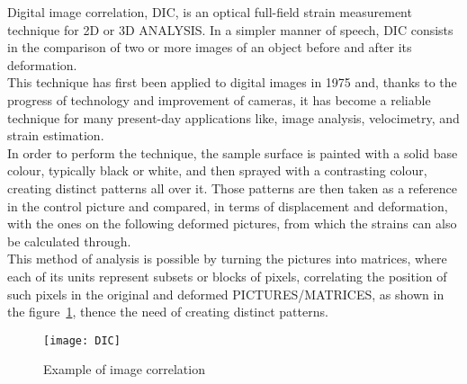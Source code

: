 






Digital image correlation, DIC, is an optical full-field strain measurement technique for 2D or 3D ANALYSIS. In a simpler manner of speech, DIC consists in the comparison of two or more images of an object before and after its deformation.\\
This technique has first been applied to digital images in 1975 and, thanks to the progress of technology and improvement of cameras, it has become a reliable technique for many present-day applications like, image analysis, velocimetry, and strain estimation.\\

In order to perform the technique, the sample surface is painted with a solid base colour, typically black or white, and then sprayed with a contrasting colour, creating distinct patterns all over it. Those patterns are then taken as a reference in the control picture and compared, in terms of displacement and deformation, with the ones on the following deformed pictures, from which the strains can also be calculated through.\\

This method of analysis is possible by turning the pictures into matrices, where each of its units represent subsets or blocks of pixels, correlating the position of such pixels in the original and deformed PICTURES/MATRICES, as shown in the figure~\ref{fig:dic}, thence the need of creating distinct patterns.\\

\begin{figure}[h!]
	\centering
	\texttt{[image: DIC]}
	\caption{Example of image correlation}
	\label{fig:dic}
\end{figure}

